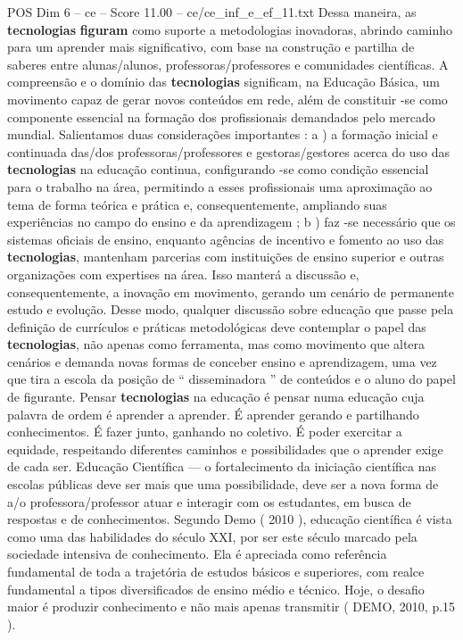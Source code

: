 \begin{textsample}{POS Dim 6 – ce – Score 11.00 – ce/ce\_inf\_e\_ef\_11.txt}
Dessa maneira, as \textbf{tecnologias} \textbf{figuram} como suporte a metodologias inovadoras, abrindo caminho para um aprender mais significativo, com base na construção e partilha de saberes entre alunas/alunos, professoras/professores e comunidades científicas.
A compreensão e o domínio das \textbf{tecnologias} significam, na Educação Básica, um movimento capaz de gerar novos conteúdos em rede, além de constituir -se como componente essencial na formação dos profissionais demandados pelo mercado mundial.
Salientamos duas considerações importantes : a ) a formação inicial e continuada das/dos professoras/professores e gestoras/gestores acerca do uso das \textbf{tecnologias} na educação continua, configurando -se como condição essencial para o trabalho na área, permitindo a esses profissionais uma aproximação ao tema de forma teórica e prática e, consequentemente, ampliando suas experiências no campo do ensino e da aprendizagem ; b ) faz -se necessário que os sistemas oficiais de ensino, enquanto agências de incentivo e fomento ao uso das \textbf{tecnologias}, mantenham parcerias com instituições de ensino superior e outras organizações com expertises na área.
Isso manterá a discussão e, consequentemente, a inovação em movimento, gerando um cenário de permanente estudo e evolução.
Desse modo, qualquer discussão sobre educação que passe pela definição de currículos e práticas metodológicas deve contemplar o papel das \textbf{tecnologias}, não apenas como ferramenta, mas como movimento que altera cenários e demanda novas formas de conceber ensino e aprendizagem, uma vez que tira a escola da posição de “ disseminadora ” de conteúdos e o aluno do papel de figurante.
Pensar \textbf{tecnologias} na educação é pensar numa educação cuja palavra de ordem é aprender a aprender.
É aprender gerando e partilhando conhecimentos.
É fazer junto, ganhando no coletivo.
É poder exercitar a equidade, respeitando diferentes caminhos e possibilidades que o aprender exige de cada ser.
Educação Científica — o fortalecimento da iniciação científica nas escolas públicas deve ser mais que uma possibilidade, deve ser a nova forma de a/o professora/professor atuar e interagir com os estudantes, em busca de respostas e de conhecimentos.
Segundo Demo ( 2010 ), educação científica é vista como uma das habilidades do século XXI, por ser este século marcado pela sociedade intensiva de conhecimento.
Ela é apreciada como referência fundamental de toda a trajetória de estudos básicos e superiores, com realce fundamental a tipos diversificados de ensino médio e técnico.
Hoje, o desafio maior é produzir conhecimento e não mais apenas transmitir ( DEMO, 2010, p.15 ).

\end{textsample}
